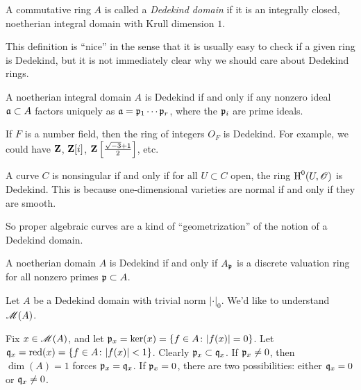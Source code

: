 \begin{definition}
A commutative ring $A$ is called a \emph{Dedekind domain}  if it is an 
integrally closed, noetherian integral domain with Krull dimension $1$. 
\end{definition}

This definition is ``nice'' in the sense that it is usually easy to check if 
a given ring is Dedekind, but it is not immediately clear why we should care 
about Dedekind rings. 

\begin{theorem}
A noetherian integral domain $A$ is Dedekind if and only if any nonzero ideal 
$\mathfrak{a}\subset A$ factors uniquely as $\mathfrak{a}=\mathfrak{p}_1\cdots \mathfrak{p}_r$, where the $\mathfrak{p}_i$ 
are prime ideals. 
\end{theorem}

\begin{example}
If $F$ is a number field, then the ring of integers $O_F$ is Dedekind. For 
example, we could have $\mathbf{Z}$, $\mathbf{Z}[i]$, 
$\mathbf{Z}\left[\frac{\sqrt{-3}+1}{2}\right]$, etc.
\end{example}

\begin{example}
A curve $C$ is nonsingular if and only if for all $U\subset C$ open, the 
ring $\operatorname{H}^0(U,\mathscr{O})$ is Dedekind. This is because one-dimensional varieties are 
normal if and only if they are smooth. 
\end{example}

So proper algebraic curves are a kind of ``geometrization'' of the notion of 
a Dedekind domain. 

\begin{lemma}
A noetherian domain $A$ is Dedekind if and only if $A_{\mathfrak{p}}$ is a discrete 
valuation ring for all nonzero primes $\mathfrak{p}\subset A$. 
\end{lemma}

Let $A$ be a Dedekind domain with trivial norm $|\cdot|_0$. We'd like to 
understand $\operatorname{\mathscr{M}}(A)$. 
\begin{center}
\end{center}
Fix $x\in \operatorname{\mathscr{M}}(A)$, and let $\mathfrak{p}_x=\ker(x)=\{f\in A\colon |f(x)|=0\}$. 
Let $\mathfrak{q}_x=\operatorname{red}(x) = \{f\in A\colon |f(x)|<1\}$. Clearly $\mathfrak{p}_x\subset \mathfrak{q}_x$. 
If $\mathfrak{p}_x\ne 0$, then $\dim(A)=1$ forces $\mathfrak{p}_x=\mathfrak{q}_x$. If $\mathfrak{p}_x=0$, there 
are two possibilities: either $\mathfrak{q}_x=0$ or $\mathfrak{q}_x\ne 0$. 

